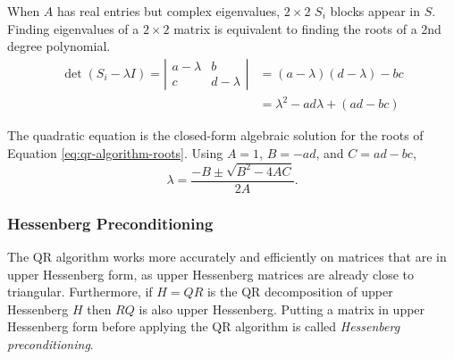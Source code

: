 
When $A$ has real entries but complex eigenvalues, $2 \times 2$ $S_i$ blocks appear in $S$.
Finding eigenvalues of a $2 \times 2$ matrix is equivalent to finding the roots of a 2nd degree polynomial.
%
\begin{align}
\nonumber \det(S_i - \lambda I) =
\left|\begin{array}{cc}
a - \lambda & b           \\
c           & d - \lambda
\end{array}\right|
&= (a - \lambda)(d - \lambda) - bc \\
&= \lambda^2 - ad\lambda + (ad - bc) \label{eq:qr-algorithm-roots}
\end{align}

The quadratic equation is the closed-form algebraic solution for the roots of Equation \ref{eq:qr-algorithm-roots}.
Using $A = 1$, $B = -ad$, and $C = ad - bc$,
\[\lambda = \frac{-B \pm \sqrt{B^2 - 4AC}}{2A}.\]

\subsubsection*{Hessenberg Preconditioning} %

The QR algorithm works more accurately and efficiently on matrices that are in upper Hessenberg form, as upper Hessenberg matrices are already close to triangular.
Furthermore, if $H = QR$ is the QR decomposition of upper Hessenberg $H$ then $RQ$ is also upper Hessenberg.
Putting a matrix in upper Hessenberg form before applying the QR algorithm is called \emph{Hessenberg preconditioning}.



